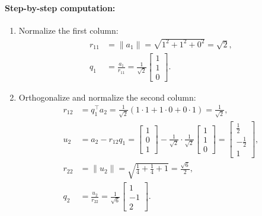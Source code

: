 \paragraph{Step-by-step computation:}
\begin{enumerate}
    \item Normalize the first column:
          \begin{align*}
              r_{11} & = \|a_1\| = \sqrt{1^2 + 1^2 + 0^2} = \sqrt{2},                                       \\
              q_1    & = \frac{a_1}{r_{11}} = \frac{1}{\sqrt{2}} \begin{bmatrix} 1 \\ 1 \\ 0 \end{bmatrix}.
          \end{align*}

    \item Orthogonalize and normalize the second column:
          \begin{align*}
              r_{12} & = q_1^\top a_2 = \frac{1}{\sqrt{2}} (1 \cdot 1 + 1 \cdot 0 + 0 \cdot 1) = \frac{1}{\sqrt{2}},                                                                                                                            \\
              u_2    & = a_2 - r_{12} q_1 = \begin{bmatrix} 1 \\ 0 \\ 1 \end{bmatrix} - \frac{1}{\sqrt{2}} \cdot \frac{1}{\sqrt{2}} \begin{bmatrix} 1 \\ 1 \\ 0 \end{bmatrix} = \begin{bmatrix} \frac{1}{2} \\ -\frac{1}{2} \\ 1 \end{bmatrix}, \\
              r_{22} & = \|u_2\| = \sqrt{\frac{1}{4} + \frac{1}{4} + 1} = \frac{\sqrt{6}}{2},                                                                                                                                                   \\
              q_2    & = \frac{u_2}{r_{22}} = \frac{1}{\sqrt{6}} \begin{bmatrix} 1 \\ -1 \\ 2 \end{bmatrix}.
          \end{align*}
\end{enumerate}

